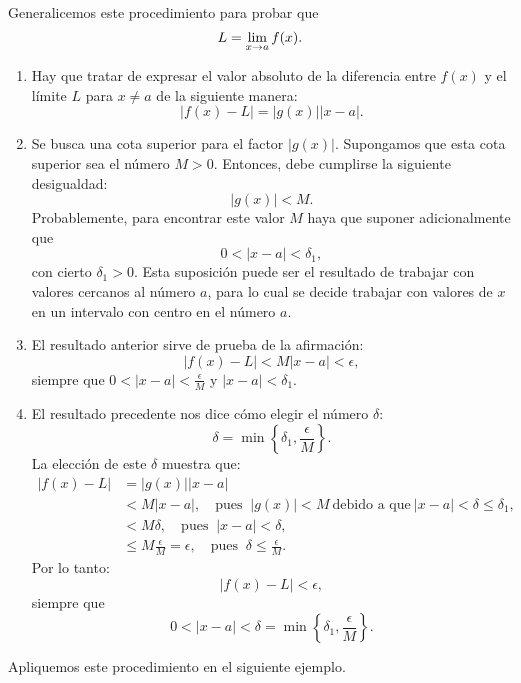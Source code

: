 Generalicemos este procedimiento para probar que
\[
L = \limjc{f(x)}{x}{a}.
\]
\begin{enumerate}
\item Hay que tratar de expresar el valor absoluto de la diferencia entre $f(x)$ y el límite
    $L$ para $x\neq a$ de la siguiente manera:
    \[
        |f(x) - L| = |g(x)||x-a|.
    \]

\item Se busca una cota superior para el factor $|g(x)|$. Supongamos que esta cota superior sea
    el número $M > 0$. Entonces, debe cumplirse la siguiente desigualdad:
    \[
    |g(x)| < M.
    \]
    Probablemente, para encontrar este valor $M$ haya que suponer adicionalmente que
    \[
        0 < |x - a| < \delta_1,
    \]
    con cierto $\delta_1 > 0$. Esta suposición puede ser el resultado de trabajar con valores
    cercanos al número $a$, para lo cual se decide trabajar con valores de $x$ en un intervalo
    con centro en el número $a$.

\item El resultado anterior sirve de prueba de la afirmación:
\[
|f(x) - L| < M|x - a| < \epsilon,
\]
siempre que $0 < |x - a| < \frac{\epsilon}{M}$ y $|x - a| < \delta_1$.

\item El resultado precedente nos dice cómo elegir el número $\delta$:
\[
\delta = \min\left\{\delta_1, \frac{\epsilon}{M}\right\}.
\]
La elección de este $\delta$ muestra que:
\begin{align*}
|f(x) - L| & = |g(x)||x - a| \\
& < M|x - a|,\quad \text{pues }\ |g(x)| < M \ \text{debido a que} \ |x - a| < \delta \leq \delta_1, \\
& < M \delta, \quad \text{pues }\ |x - a| < \delta, \\
& \leq M\frac{\epsilon}{M} = \epsilon, \quad\text{pues }\ \delta \leq \frac{\epsilon}{M}.
\end{align*}
Por lo tanto:
\[
|f(x) - L| < \epsilon,
\]
siempre que
\[
0 < |x - a| < \delta = \min\left\{\delta_1, \frac{\epsilon}{M}\right\}.
\]
\end{enumerate}

Apliquemos este procedimiento en el siguiente ejemplo.

